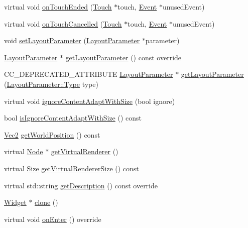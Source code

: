 \begin{DoxyCompactItemize}
\item 
virtual void \hyperlink{classui_1_1Widget_a72e5e4992dc42c5209759d3c1ee95387}{on\+Touch\+Ended} (\hyperlink{classTouch}{Touch} $\ast$touch, \hyperlink{classEvent}{Event} $\ast$unused\+Event)
\item 
virtual void \hyperlink{classui_1_1Widget_a4b624372c2171e67c43aac69f9fa5447}{on\+Touch\+Cancelled} (\hyperlink{classTouch}{Touch} $\ast$touch, \hyperlink{classEvent}{Event} $\ast$unused\+Event)
\item 
void \hyperlink{classui_1_1Widget_abf9d727a2726259f82c097543d0be2d1}{set\+Layout\+Parameter} (\hyperlink{classui_1_1LayoutParameter}{Layout\+Parameter} $\ast$parameter)
\item 
\hyperlink{classui_1_1LayoutParameter}{Layout\+Parameter} $\ast$ \hyperlink{classui_1_1Widget_a4d8d234130e8bd8214fa924369b8060f}{get\+Layout\+Parameter} () const override
\item 
C\+C\+\_\+\+D\+E\+P\+R\+E\+C\+A\+T\+E\+D\+\_\+\+A\+T\+T\+R\+I\+B\+U\+TE \hyperlink{classui_1_1LayoutParameter}{Layout\+Parameter} $\ast$ \hyperlink{classui_1_1Widget_a63167ea03dc8ad08303849cf18e8ca21}{get\+Layout\+Parameter} (\hyperlink{classui_1_1LayoutParameter_a1b01e01e7e6fc3de80f2e6d07fae806e}{Layout\+Parameter\+::\+Type} type)
\item 
virtual void \hyperlink{classui_1_1Widget_a8971609befb6edde5b81a84dd7e8a52c}{ignore\+Content\+Adapt\+With\+Size} (bool ignore)
\item 
bool \hyperlink{classui_1_1Widget_a6d0624feb9ef5cfbafdb71b80473390a}{is\+Ignore\+Content\+Adapt\+With\+Size} () const
\item 
\hyperlink{classVec2}{Vec2} \hyperlink{classui_1_1Widget_a312cec82d35501ebb0431ddf780dac07}{get\+World\+Position} () const
\item 
virtual \hyperlink{classNode}{Node} $\ast$ \hyperlink{classui_1_1Widget_a2ac31b8b4c7d3fa9d285bf194d685ccf}{get\+Virtual\+Renderer} ()
\item 
virtual \hyperlink{classSize}{Size} \hyperlink{classui_1_1Widget_ae93f34368420f7a664f3cc66d496a21f}{get\+Virtual\+Renderer\+Size} () const
\item 
virtual std\+::string \hyperlink{classui_1_1Widget_a5955006f31a13706d69b4d261f2f98cd}{get\+Description} () const override
\item 
\hyperlink{classui_1_1Widget}{Widget} $\ast$ \hyperlink{classui_1_1Widget_a4496285e3cc77f902260da953b55039c}{clone} ()
\item 
virtual void \hyperlink{classui_1_1Widget_a1df4415ad57003db87a5e9b069b56956}{on\+Enter} () override

\end{DoxyCompactItemize}
